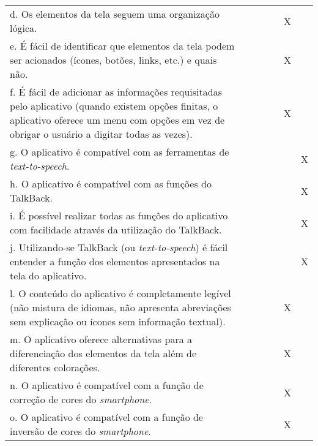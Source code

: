\documentclass[portuguese,oneside]{tcc}
\begin{document}
\begin{table}[h]
{\begin{tabu}{|L{25em}|c|c|c|c|c|c|}
							d. Os elementos da tela seguem uma organização lógica. & & & & & X & \\ 
							e. É fácil de identificar que elementos da tela podem ser acionados (ícones, botões, links, etc.) e quais não. & & & & & X & \\ 
							f. É fácil de adicionar as informações requisitadas pelo aplicativo (quando existem opções finitas, o aplicativo oferece um menu com opções em vez de obrigar o usuário a digitar todas as vezes). & & & & & X & \\ 
							g. O aplicativo é compatível com as ferramentas de \emph{text-to-speech}. & & & & & & X \\ 
							h. O aplicativo é compatível com as funções do TalkBack. & & & & & & X \\ 
							i. É possível realizar todas as funções do aplicativo com facilidade através da utilização do TalkBack.	& & & & & & X \\ 
							j. Utilizando-se TalkBack (ou \emph{text-to-speech}) é fácil entender a função dos elementos apresentados na tela do aplicativo. & & & & & & X \\ 
							l. O conteúdo do aplicativo é completamente legível (não mistura de idiomas, não apresenta abreviações sem explicação ou ícones sem informação textual). & & & & & X & \\ 
							m. O aplicativo oferece alternativas para a diferenciação dos elementos da tela além de diferentes colorações. & & & & & X & \\ 
							n. O aplicativo é compatível com a função de correção de cores do \emph{smartphone}. & & & & & X & \\ 
							o. O aplicativo é compatível com a função de inversão de cores do \emph{smartphone}. & & & & & X & \\ 
						\end{tabu}}
					\end{table}
					
\end{document}
